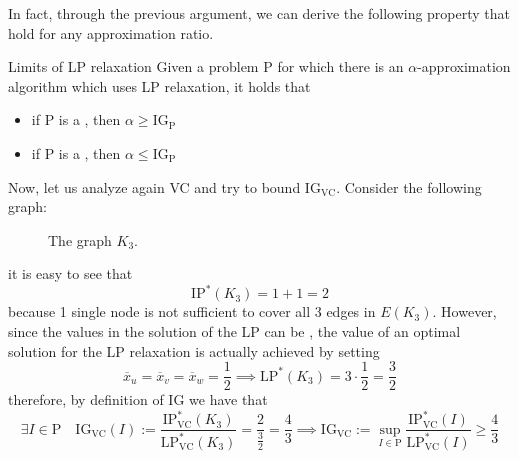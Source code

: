\documentclass[a4paper, 12pt]{report}
\begin{document}
    In fact, through the previous argument, we can derive the following property that  hold for any approximation ratio.

    \begin{framedprop}{Limits of LP relaxation}
        Given a problem P for which there is an $\alpha$-approximation algorithm which uses LP relaxation, it holds that

        \begin{itemize}
            \item if P is a , then $\alpha \ge \mathrm{IG_P}$
            \item if P is a , then $\alpha \le \mathrm{IG_P}$
        \end{itemize}
    \end{framedprop}


    Now, let us analyze again VC and try to bound $\mathrm{IG_{VC}}$. Consider the following  graph:
    
    \begin{figure}[H]
        \centering
        \caption{The graph $K_3$.}
    \end{figure}

    it is easy to see that $$\mathrm{IP^*}(K_3) = 1 + 1 = 2$$ because 1 single node is not sufficient to cover all 3 edges in $E(K_3)$. However, since the values in the solution of the LP can be , the value of an optimal solution for the LP relaxation is actually achieved by setting $$\overline x_u = \overline x_v = \overline x_w = \dfrac{1}{2} \implies \mathrm{LP}^*(K_3) = 3 \cdot \dfrac{1}{2} = \dfrac{3}{2}$$ therefore, by definition of IG we have that $$\exists I \in \mathrm P \quad \mathrm{IG_{VC}}(I) := \dfrac{\mathrm{IP^*_{VC}}(K_3)}{\mathrm{LP^*_{VC}}(K_3)} = \dfrac{2}{\tfrac{3}{2}} = \dfrac{4}{3} \implies \mathrm{IG_{VC}} := \sup_{I \in \mathrm P}{\dfrac{\mathrm{IP^*_{VC}}(I)}{\mathrm{LP^*_{VC}}(I)}} \ge \dfrac{4}{3}$$ 
\end{document}
